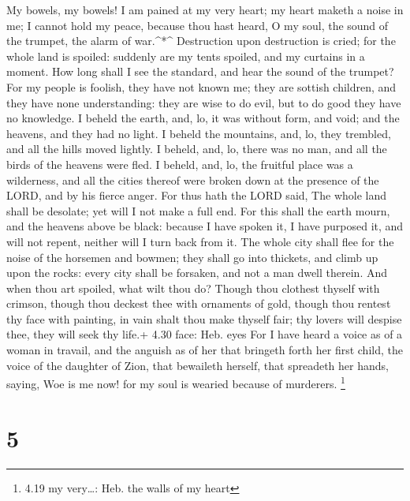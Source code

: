  My bowels, my bowels! I am pained at my very heart; my
heart maketh a noise in me; I cannot hold my peace, because thou hast
heard, O my soul, the sound of the trumpet, the alarm of war.\^{}*\^{}
 Destruction upon destruction is cried; for the whole land
is spoiled: suddenly are my tents spoiled, and my curtains in a moment.
 How long shall I see the standard, and hear the sound of
the trumpet?  For my people is foolish, they have not known
me; they are sottish children, and they have none understanding: they
are wise to do evil, but to do good they have no knowledge.
 I beheld the earth, and, lo, it was without form, and
void; and the heavens, and they had no light.  I beheld the
mountains, and, lo, they trembled, and all the hills moved lightly.
 I beheld, and, lo, there was no man, and all the birds of
the heavens were fled.  I beheld, and, lo, the fruitful
place was a wilderness, and all the cities thereof were broken down at
the presence of the LORD, and by his fierce anger.  For
thus hath the LORD said, The whole land shall be desolate; yet will I
not make a full end.  For this shall the earth mourn, and
the heavens above be black: because I have spoken it, I have purposed
it, and will not repent, neither will I turn back from it. 
The whole city shall flee for the noise of the horsemen and bowmen; they
shall go into thickets, and climb up upon the rocks: every city shall be
forsaken, and not a man dwell therein.  And when thou art
spoiled, what wilt thou do? Though thou clothest thyself with crimson,
though thou deckest thee with ornaments of gold, though thou rentest thy
face with painting, in vain shalt thou make thyself fair; thy lovers
will despise thee, they will seek thy life.+ 4.30 face: Heb. eyes
 For I have heard a voice as of a woman in travail, and the
anguish as of her that bringeth forth her first child, the voice of the
daughter of Zion, that bewaileth herself, that spreadeth her hands,
saying, Woe is me now! for my soul is wearied because of murderers.
\footnote{4.19 my very\ldots: Heb. the walls of my heart}

\hypertarget{section-4}{%
\section{5}\label{section-4}}

